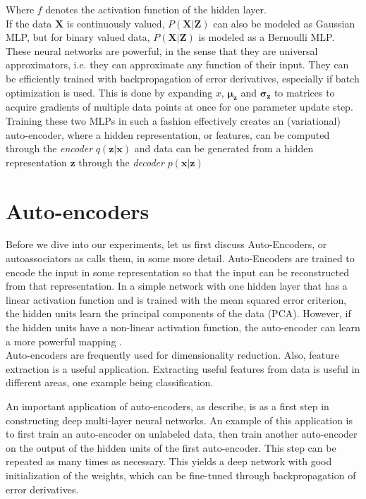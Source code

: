 \documentclass{article}
\begin{document}
Where $f$ denotes the activation function of the hidden layer.\\
If the data $\mathbf{X}$ is continuously valued, $P(\mathbf{X}|\mathbf{Z})$ can also be modeled as Gaussian MLP, but for binary valued data, $P(\mathbf{X}|\mathbf{Z})$ is modeled as a Bernoulli MLP. These neural networks are powerful, in the sense that they are universal approximators, i.e. they can approximate any function of their input. They can be efficiently trained with backpropagation of error derivatives, especially if batch optimization is used. This is done by expanding $x$, $\mathbf{\mu_z}$ and $\mathbf{\sigma_z}$ to matrices to acquire gradients of multiple data points at once for one parameter update step.\\
Training these two MLPs in such a fashion effectively creates an (variational) auto-encoder, where a hidden representation, or features, can be computed through the \textit{encoder} $q(\mathbf{z}|\mathbf{x})$ and data can be generated from a hidden representation $\mathbf{z}$ through the \textit{decoder} $p(\mathbf{x}|\mathbf{z})$

\section{Auto-encoders}

Before we dive into our experiments, let us first discuss Auto-Encoders, or autoassociators as \cite{bengio2009learning} calls them, in some more detail. Auto-Encoders are trained to encode the input in some representation so that the input can be reconstructed from that representation. In a simple network with one hidden layer that has a linear activation function and is trained with the mean squared error criterion, the hidden units learn the principal components of the data (PCA). However, if the hidden units have a non-linear activation function, the auto-encoder can learn a more powerful mapping \cite{japkowicz2000nonlinear}. \\
Auto-encoders are frequently used for dimensionality reduction. Also, feature extraction is a useful application. Extracting useful features from data is useful in different areas, one example being classification.

An important application of auto-encoders, as \cite{bengio2009learning} describe, is as a first step in constructing deep multi-layer neural networks. An example of this application is to first train an auto-encoder on unlabeled data, then train another auto-encoder on the output of the hidden units of the first auto-encoder. This step can be repeated as many times as necessary. This yields a deep network with good initialization of the weights, which can be fine-tuned through backpropagation of error derivatives. 
\end{document}
